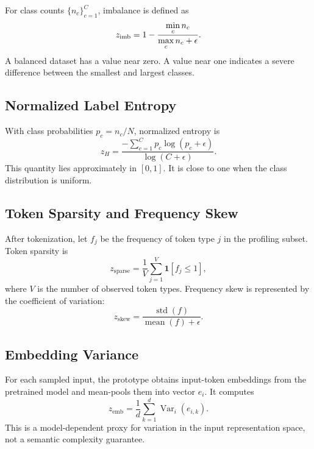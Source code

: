 For class counts $\{n_c\}_{c=1}^{C}$, imbalance is defined as
\begin{equation}
  z_{\mathrm{imb}} =
  1 - \frac{\mathop{\rm min}\limits_c n_c}{\mathop{\rm max}\limits_c n_c + \epsilon}.
  \label{eq:imbalance}
\end{equation}
A balanced dataset has a value near zero. A value near one indicates a severe difference between
the smallest and largest classes.

\subsection{Normalized Label Entropy}

With class probabilities $p_c=n_c/N$, normalized entropy is
\begin{equation}
  z_H =
  \frac{-\sum_{c=1}^{C} p_c \log(p_c+\epsilon)}
       {\log(C+\epsilon)}.
  \label{eq:entropy}
\end{equation}
This quantity lies approximately in $[0,1]$. It is close to one when the class distribution is
uniform.

\subsection{Token Sparsity and Frequency Skew}

After tokenization, let $f_j$ be the frequency of token type $j$ in the profiling subset.
Token sparsity is
\begin{equation}
  z_{\mathrm{sparse}} =
  \frac{1}{V}\sum_{j=1}^{V}\mathbf{1}[f_j \le 1],
  \label{eq:sparsity}
\end{equation}
where $V$ is the number of observed token types. Frequency skew is represented by the coefficient
of variation:
\begin{equation}
  z_{\mathrm{skew}} =
  \frac{\operatorname{std}(f)}
       {\operatorname{mean}(f)+\epsilon}.
  \label{eq:token-skew}
\end{equation}

\subsection{Embedding Variance}

For each sampled input, the prototype obtains input-token embeddings from the pretrained model and
mean-pools them into vector $e_i$. It computes
\begin{equation}
  z_{\mathrm{emb}} =
  \frac{1}{d}\sum_{k=1}^{d}
  \operatorname{Var}_i(e_{i,k}).
  \label{eq:embedding-variance}
\end{equation}
This is a model-dependent proxy for variation in the input representation space, not a semantic
complexity guarantee.

